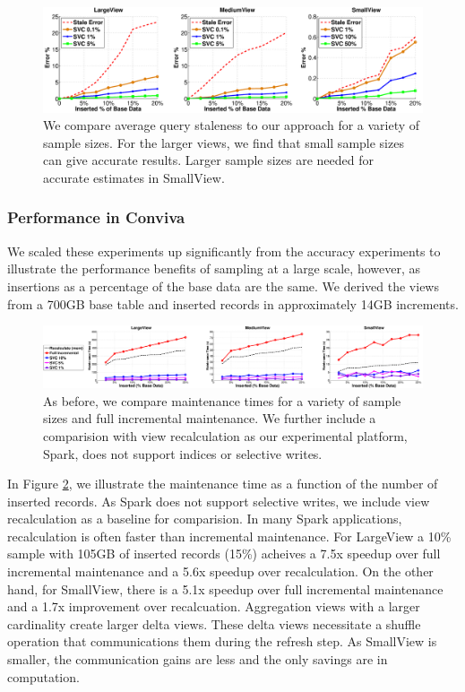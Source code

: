 \begin{figure}[ht!]
\hspace{-3.5em}
\includegraphics[scale=0.22]{exp/exp5-coniva-accuracy.eps}
 \caption{We compare average query staleness to our approach for a variety of sample sizes. For the larger views, we find that small sample sizes can give accurate results. Larger sample sizes are needed for accurate estimates in SmallView. \label{exp5conviva}}
\end{figure}

\subsubsection{Performance in Conviva}
We scaled these experiments up significantly from the accuracy experiments to illustrate the performance benefits of sampling at a large scale, however, as insertions as a percentage of the base data are the same.
We derived the views from a 700GB base table and inserted records in approximately 14GB increments. 

\begin{figure}[ht!]

\hspace{-1em}
\includegraphics[scale=0.20]{exp/exp5-efficiency-conviva.eps}
 \caption{As before, we compare maintenance times for a variety of sample sizes and full incremental maintenance. We further include a comparision with view recalculation as our experimental platform, Spark, does not support indices or selective writes.\label{exp6conviva}}
\end{figure}

In Figure \ref{exp6conviva}, we illustrate the maintenance time as a function of the number of inserted records.
As Spark does not support selective writes, we include view recalculation as a baseline for comparision.
In many Spark applications, recalculation is often faster than incremental maintenance.
For LargeView a 10\% sample with 105GB of inserted records (15\%) acheives a  7.5x speedup over full incremental maintenance and a 5.6x speedup over recalculation.
On the other hand, for SmallView, there is a 5.1x speedup over full incremental maintenance and a 1.7x improvement over recalcuation.
Aggregation views with a larger cardinality create larger delta views.
These delta views necessitate a shuffle operation that communications them during the refresh step.
As SmallView is smaller, the communication gains are less and the only savings are in computation.



